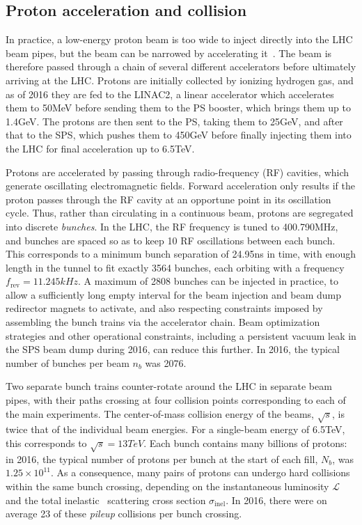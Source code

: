 \subsection{Proton acceleration and collision} \label{sec:LHCCMS_LHC_proton_acceleration}
In practice, a low-energy proton beam is too wide to inject directly into the LHC beam pipes, but the beam can be narrowed by accelerating it~\cite{ref:PartPhysLHCEra}.
The beam is therefore passed through a chain of several different accelerators before ultimately arriving at the LHC.
Protons are initially collected by ionizing hydrogen gas, and as of 2016 they are fed to the LINAC2, a linear accelerator which accelerates
them to 50\unit{MeV} before sending them to the PS booster, which brings them up to 1.4\unit{GeV}. The protons are then sent to the PS, taking them to 25\unit{GeV},
and after that to the SPS, which pushes them to 450\unit{GeV} before finally injecting them into the LHC for final acceleration up to 6.5\unit{TeV}.

Protons are accelerated by passing through radio-frequency (RF) cavities, which generate oscillating electromagnetic
fields. Forward acceleration only results if the proton passes through the RF cavity at an opportune point in its oscillation cycle.
Thus, rather than circulating in a continuous beam, protons are segregated into discrete \textit{bunches}. In the LHC, the RF
frequency is tuned to 400.790\unit{MHz}, and bunches are spaced so as to keep 10 RF oscillations between each bunch. This corresponds
to a minimum bunch separation of 24.95\unit{ns} in time, with enough length in the tunnel to fit exactly 3564 bunches, each orbiting
with a frequency $f_\mathrm{rev} = 11.245\unit{kHz}$. A maximum of
2808 bunches can be injected in practice, to allow a sufficiently long empty interval for the beam injection and beam dump
redirector magnets to activate, and also respecting constraints imposed by assembling the bunch trains via the accelerator chain.
Beam optimization strategies and other operational constraints, including a persistent vacuum leak in the SPS beam dump
during 2016, can reduce this further. In 2016, the typical number of bunches per beam $n_b$ was 2076.

Two separate bunch trains counter-rotate around the LHC in separate beam pipes, with their paths crossing at four collision points
corresponding to each of the main experiments. The center-of-mass collision energy of the beams, $\sqrt{s}$, is twice that of the
individual beam energies. For a single-beam energy of 6.5\unit{TeV}, this corresponds to $\sqrt{s} = 13\unit{TeV}$.
Each bunch contains many billions of protons: in 2016, the typical number of protons per bunch at the start of each fill, $N_b$, was $1.25 \times 10^{11}$.
As a consequence, many pairs of protons can undergo hard collisions within the same
bunch crossing, depending on the instantaneous luminosity $\mathcal{L}$ and the total inelastic \Pp\Pp\ scattering cross section $\sigma_\mathrm{inel}$.
In 2016, there were on average 23 of these \textit{pileup} collisions per bunch crossing.

